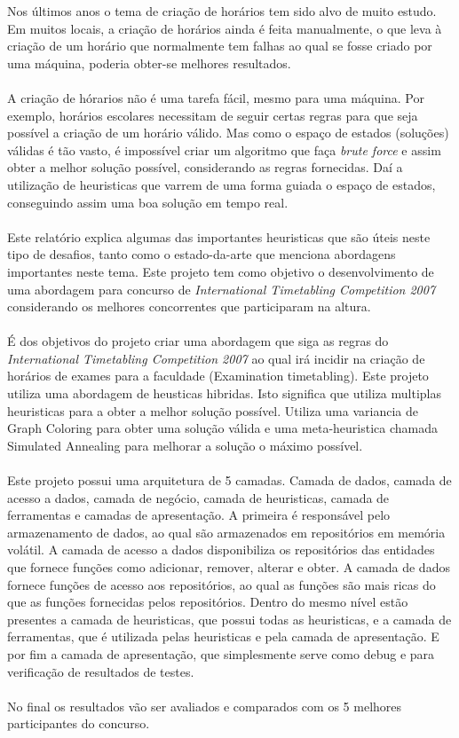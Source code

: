 Nos últimos anos o tema de criação de horários tem sido alvo de muito estudo. Em muitos locais, a criação de horários ainda é feita manualmente, o que leva à criação de um horário que normalmente tem falhas ao qual se fosse criado por uma máquina, poderia obter-se melhores resultados.\\
\\
A criação de hórarios não é uma tarefa fácil, mesmo para uma máquina. Por exemplo, horários escolares necessitam de seguir certas regras para que seja possível a criação de um horário válido. Mas como o espaço de estados (soluções) válidas é tão vasto, é impossível criar um algoritmo que faça \textit{brute force} e assim obter a melhor solução possível, considerando as regras fornecidas. Daí a utilização de heuristicas que varrem de uma forma guiada o espaço de estados, conseguindo assim uma boa solução em tempo real.\\
\\
Este relatório explica algumas das importantes heuristicas que são úteis neste tipo de desafios, tanto como o estado-da-arte que menciona abordagens importantes neste tema. Este projeto tem como objetivo o desenvolvimento de uma abordagem para concurso de \textit{International Timetabling Competition 2007} considerando os melhores concorrentes que participaram na altura.\\
\\
É dos objetivos do projeto criar uma abordagem que siga as regras do \textit{International Timetabling Competition 2007} ao qual irá incidir na criação de horários de exames para a faculdade (Examination timetabling). Este projeto utiliza uma abordagem de heusticas hibridas. Isto significa que utiliza multiplas heuristicas para a obter a melhor solução possível. Utiliza uma variancia de Graph Coloring para obter uma solução válida e uma meta-heuristica chamada Simulated Annealing para melhorar a solução o máximo possível.\\
\\
Este projeto possui uma arquitetura de 5 camadas. Camada de dados, camada de acesso a dados, camada de negócio, camada de heuristicas, camada de ferramentas e camadas de apresentação. A primeira é responsável pelo armazenamento de dados, ao qual são armazenados em repositórios em memória volátil. A camada de acesso a dados disponibiliza os repositórios das entidades que fornece funções como adicionar, remover, alterar e obter. A camada de dados fornece funções de acesso aos repositórios, ao qual as funções são mais ricas do que as funções fornecidas pelos repositórios. Dentro do mesmo nível estão presentes a camada de heuristicas, que possui todas as heuristicas, e a camada de ferramentas, que é utilizada pelas heuristicas e pela camada de apresentação. E por fim a camada de apresentação, que simplesmente serve como debug e para verificação de resultados de testes.\\
\\
No final os resultados vão ser avaliados e comparados com os 5 melhores participantes do concurso.
\
